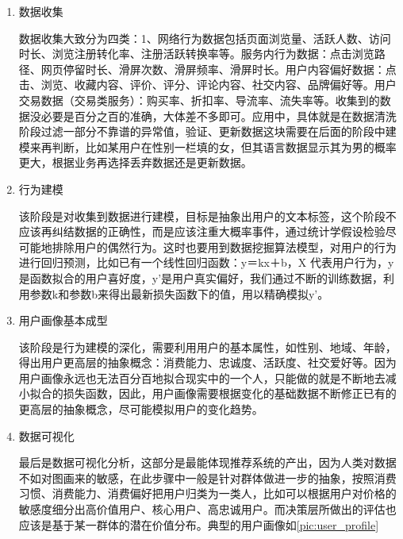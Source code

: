 	    \begin{enumerate}[(1)]
	    \item 数据收集

	    数据收集大致分为四类：1、网络行为数据包括页面浏览量、活跃人数、访问时长、浏览注册转化率、注册活跃转换率等。服务内行为数据：点击浏览路径、网页停留时长、滑屏次数、滑屏频率、滑屏时长。用户内容偏好数据：点击、浏览、收藏内容、评价、评分、评论内容、社交内容、品牌偏好等。用户交易数据（交易类服务）：购买率、折扣率、导流率、流失率等。收集到的数据没必要是百分之百的准确，大体差不多即可。应用中，具体就是在数据清洗阶段过滤一部分不靠谱的异常值，验证、更新数据这块需要在后面的阶段中建模来再判断，比如某用户在性别一栏填的女，但其语言数据显示其为男的概率更大，根据业务再选择丢弃数据还是更新数据。
	    
	    \item 行为建模

	    该阶段是对收集到数据进行建模，目标是抽象出用户的文本标签，这个阶段不应该再纠结数据的正确性，而是应该注重大概率事件，通过统计学假设检验尽可能地排除用户的偶然行为。这时也要用到数据挖掘算法模型，对用户的行为进行回归预测，比如已有一个线性回归函数：y＝kx＋b，X 代表用户行为，y是函数拟合的用户喜好度，y'是用户真实偏好，我们通过不断的训练数据，利用参数k和参数b来得出最新损失函数下的值，用以精确模拟y'。

	    \item 用户画像基本成型

	    该阶段是行为建模的深化，需要利用用户的基本属性，如性别、地域、年龄，得出用户更高层的抽象概念：消费能力、忠诚度、活跃度、社交爱好等。因为用户画像永远也无法百分百地拟合现实中的一个人，只能做的就是不断地去减小拟合的损失函数，因此，用户画像需要根据变化的基础数据不断修正已有的更高层的抽象概念，尽可能模拟用户的变化趋势。

	    \item 数据可视化

	    最后是数据可视化分析，这部分是最能体现推荐系统的产出，因为人类对数据不如对图画来的敏感，在此步骤中一般是针对群体做进一步的抽象，按照消费习惯、消费能力、消费偏好把用户归类为一类人，比如可以根据用户对价格的敏感度细分出高价值用户、核心用户、高忠诚用户。而决策层所做出的评估也应该是基于某一群体的潜在价值分布。典型的用户画像如\autoref{pic:user_profile}
	    \end{enumerate}
